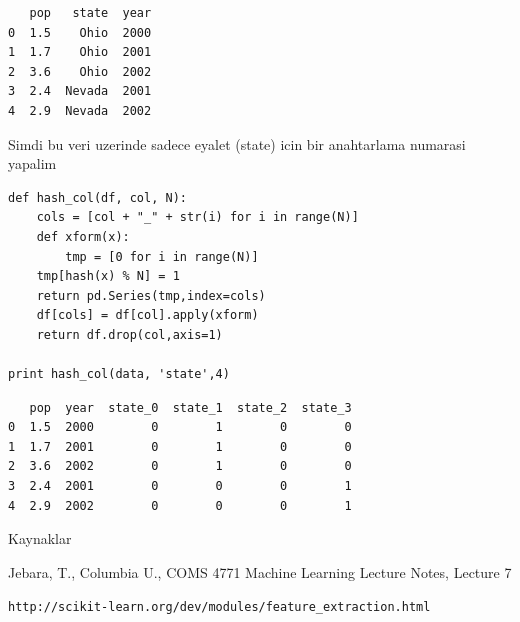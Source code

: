 \documentclass[12pt,fleqn]{article}\usepackage{../common}
\begin{document}
\begin{verbatim}
   pop   state  year
0  1.5    Ohio  2000
1  1.7    Ohio  2001
2  3.6    Ohio  2002
3  2.4  Nevada  2001
4  2.9  Nevada  2002
\end{verbatim}

Simdi bu veri uzerinde sadece eyalet (state) icin bir anahtarlama numarasi
yapalim

\begin{verbatim}
def hash_col(df, col, N):
    cols = [col + "_" + str(i) for i in range(N)]
    def xform(x):
        tmp = [0 for i in range(N)]
	tmp[hash(x) % N] = 1
	return pd.Series(tmp,index=cols)
    df[cols] = df[col].apply(xform)
    return df.drop(col,axis=1)

print hash_col(data, 'state',4)
\end{verbatim}

\begin{verbatim}
   pop  year  state_0  state_1  state_2  state_3
0  1.5  2000        0        1        0        0
1  1.7  2001        0        1        0        0
2  3.6  2002        0        1        0        0
3  2.4  2001        0        0        0        1
4  2.9  2002        0        0        0        1
\end{verbatim}

Kaynaklar

Jebara, T., Columbia U., COMS 4771 Machine Learning Lecture Notes, Lecture 7

\verb!http://scikit-learn.org/dev/modules/feature_extraction.html!
\end{document}

